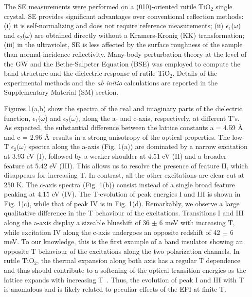 \documentclass[aps,prl,twocolumn,amsfonts,nobibnotes,superscriptaddress,showpacs]{revtex4-1}
\begin{document}
The SE measurements were performed on a (010)-oriented rutile TiO$_2$ single crystal. SE provides significant advantages over conventional reflection methods: (i) it is self-normalizing and does not require reference measurements; (ii) $\epsilon_1$($\omega$) and $\epsilon_2$($\omega$) are obtained directly without a Kramers-Kronig (KK) transformation; (iii) in the ultraviolet, SE is less affected by the surface roughness of the sample than normal-incidence reflectivity. Many-body perturbation theory at the level of the GW and the Bethe-Salpeter Equation (BSE) \cite{ref:hedin1, ref:onida} was employed to compute the band structure and the dielectric response of rutile TiO$_2$. Details of the experimental methods and the \textit{ab initio} calculations are reported in the Supplementary Material (SM) section.

Figures 1(a,b) show the spectra of the real and imaginary parts of the dielectric function, $\epsilon_1$($\omega$) and $\epsilon_2$($\omega$), along the a- and c-axis, respectively, at different T's. As expected, the substantial difference between the lattice constants a = 4.59 \AA~ and c = 2.96 \AA~results in a strong anisotropy of the optical properties. The low-T $\epsilon_2$($\omega$) spectra along the a-axis (Fig. 1(a)) are dominated by a narrow excitation at 3.93 eV (I), followed by a weaker shoulder at 4.51 eV (II) and a broader feature at 5.42 eV (III). This allows us to resolve the presence of feature II, which disappears for increasing T. In contrast, all the other excitations are clear cut at 250 K. The c-axis spectra (Fig. 1(b)) consist instead of a single broad feature peaking at 4.15 eV (IV). The T-evolution of peak energies I and III is shown in Fig. 1(c), while that of peak IV is in Fig. 1(d). Remarkably, we observe a large qualitative difference in the T behaviour of the excitations. Transitions I and III along the a-axis display a sizeable blueshift of 36 $\pm$ 6 meV with increasing T, while excitation IV along the c-axis undergoes an opposite redshift of 42 $\pm$ 6 meV. To our knowledge, this is the first example of a band insulator showing an opposite T behaviour of the excitations along the two polarization channels. In rutile TiO$_2$, the thermal expansion along both axis has a regular T dependence and thus should contribute to a softening of the optical transition energies as the lattice expands with increasing T~\cite{rao1970thermal}. Thus, the evolution of peak I and III with T is anomalous and is likely related to peculiar effects of the EPI at finite T. 
\end{document}
